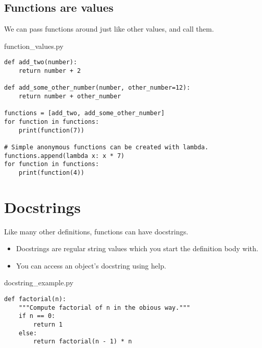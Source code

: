 \documentclass[aspectratio=1610,slidestop]{beamer}
\begin{document}
\subsection{Functions are values}
\begin{pframe}
 We can pass functions around just like other values, and call them.
 \begin{pythonfile}{function\_values.py}
  \begin{verbatim}
def add_two(number):
    return number + 2

def add_some_other_number(number, other_number=12):
    return number + other_number

functions = [add_two, add_some_other_number]
for function in functions:
    print(function(7))

# Simple anonymous functions can be created with lambda.
functions.append(lambda x: x * 7)
for function in functions:
    print(function(4))
  \end{verbatim}
 \end{pythonfile}
\end{pframe}



\section{Docstrings}
\begin{pframe}
 Like many other definitions, functions can have docstrings.
 \begin{itemize}
  \item Docstrings are regular string values which you start the definition
  body with.
  \item You can access an object's docstring using help.
 \end{itemize}
 \begin{pythonfile}{docstring\_example.py}
  \begin{verbatim}
def factorial(n):
    """Compute factorial of n in the obious way."""
    if n == 0:
        return 1
    else:
        return factorial(n - 1) * n
  \end{verbatim}
 \end{pythonfile}
\end{pframe}
\end{document}
